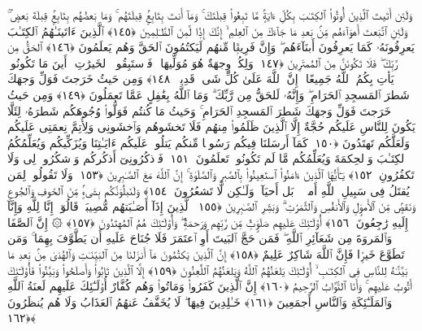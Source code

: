  وَلَئِن أَتَيتَ ٱلَّذِينَ أُوتُوا۟ ٱلكِتَـٰبَ بِكُلِّ ءَايَةٍۢ مَّا تَبِعُوا۟ قِبلَتَكَ ۚ وَمَآ أَنتَ بِتَابِعٍۢ قِبلَتَهُم ۚ وَمَا بَعضُهُم بِتَابِعٍۢ قِبلَةَ بَعضٍۢ ۚ وَلَئِنِ ٱتَّبَعتَ أَهوَآءَهُم مِّنۢ بَعدِ مَا جَآءَكَ مِنَ ٱلعِلمِ ۙ إِنَّكَ إِذًۭا لَّمِنَ ٱلظَّـٰلِمِينَ ﴿١٤٥﴾
 ٱلَّذِينَ ءَاتَينَـٰهُمُ ٱلكِتَـٰبَ يَعرِفُونَهُۥ كَمَا يَعرِفُونَ أَبنَآءَهُم ۖ وَإِنَّ فَرِيقًۭا مِّنهُم لَيَكتُمُونَ ٱلحَقَّ وَهُم يَعلَمُونَ ﴿١٤٦﴾
 ٱلحَقُّ مِن رَّبِّكَ ۖ فَلَا تَكُونَنَّ مِنَ ٱلمُمتَرِينَ ﴿١٤٧﴾
 وَلِكُلٍّۢ وِجهَةٌ هُوَ مُوَلِّيهَا ۖ فَٱستَبِقُوا۟ ٱلخَيرَٰتِ ۚ أَينَ مَا تَكُونُوا۟ يَأتِ بِكُمُ ٱللَّهُ جَمِيعًا ۚ إِنَّ ٱللَّهَ عَلَىٰ كُلِّ شَىءٍۢ قَدِيرٌۭ ﴿١٤٨﴾
 وَمِن حَيثُ خَرَجتَ فَوَلِّ وَجهَكَ شَطرَ ٱلمَسجِدِ ٱلحَرَامِ ۖ وَإِنَّهُۥ لَلحَقُّ مِن رَّبِّكَ ۗ وَمَا ٱللَّهُ بِغَٰفِلٍ عَمَّا تَعمَلُونَ ﴿١٤٩﴾
 وَمِن حَيثُ خَرَجتَ فَوَلِّ وَجهَكَ شَطرَ ٱلمَسجِدِ ٱلحَرَامِ ۚ وَحَيثُ مَا كُنتُم فَوَلُّوا۟ وُجُوهَكُم شَطرَهُۥ لِئَلَّا يَكُونَ لِلنَّاسِ عَلَيكُم حُجَّةٌ إِلَّا ٱلَّذِينَ ظَلَمُوا۟ مِنهُم فَلَا تَخشَوهُم وَٱخشَونِى وَلِأُتِمَّ نِعمَتِى عَلَيكُم وَلَعَلَّكُم تَهتَدُونَ ﴿١٥٠﴾
 كَمَآ أَرسَلنَا فِيكُم رَسُولًۭا مِّنكُم يَتلُوا۟ عَلَيكُم ءَايَـٰتِنَا وَيُزَكِّيكُم وَيُعَلِّمُكُمُ ٱلكِتَـٰبَ وَٱلحِكمَةَ وَيُعَلِّمُكُم مَّا لَم تَكُونُوا۟ تَعلَمُونَ ﴿١٥١﴾
 فَٱذكُرُونِىٓ أَذكُركُم وَٱشكُرُوا۟ لِى وَلَا تَكفُرُونِ ﴿١٥٢﴾
 يَـٰٓأَيُّهَا ٱلَّذِينَ ءَامَنُوا۟ ٱستَعِينُوا۟ بِٱلصَّبرِ وَٱلصَّلَوٰةِ ۚ إِنَّ ٱللَّهَ مَعَ ٱلصَّـٰبِرِينَ ﴿١٥٣﴾
 وَلَا تَقُولُوا۟ لِمَن يُقتَلُ فِى سَبِيلِ ٱللَّهِ أَموَٟتٌۢ ۚ بَل أَحيَآءٌۭ وَلَـٰكِن لَّا تَشعُرُونَ ﴿١٥٤﴾
 وَلَنَبلُوَنَّكُم بِشَىءٍۢ مِّنَ ٱلخَوفِ وَٱلجُوعِ وَنَقصٍۢ مِّنَ ٱلأَموَٟلِ وَٱلأَنفُسِ وَٱلثَّمَرَٰتِ ۗ وَبَشِّرِ ٱلصَّـٰبِرِينَ ﴿١٥٥﴾
 ٱلَّذِينَ إِذَآ أَصَـٰبَتهُم مُّصِيبَةٌۭ قَالُوٓا۟ إِنَّا لِلَّهِ وَإِنَّآ إِلَيهِ رَٰجِعُونَ ﴿١٥٦﴾
 أُو۟لَـٰٓئِكَ عَلَيهِم صَلَوَٟتٌۭ مِّن رَّبِّهِم وَرَحمَةٌۭ ۖ وَأُو۟لَـٰٓئِكَ هُمُ ٱلمُهتَدُونَ ﴿١٥٧﴾
 ۞ إِنَّ ٱلصَّفَا وَٱلمَروَةَ مِن شَعَآئِرِ ٱللَّهِ ۖ فَمَن حَجَّ ٱلبَيتَ أَوِ ٱعتَمَرَ فَلَا جُنَاحَ عَلَيهِ أَن يَطَّوَّفَ بِهِمَا ۚ وَمَن تَطَوَّعَ خَيرًۭا فَإِنَّ ٱللَّهَ شَاكِرٌ عَلِيمٌ ﴿١٥٨﴾
 إِنَّ ٱلَّذِينَ يَكتُمُونَ مَآ أَنزَلنَا مِنَ ٱلبَيِّنَـٰتِ وَٱلهُدَىٰ مِنۢ بَعدِ مَا بَيَّنَّـٰهُ لِلنَّاسِ فِى ٱلكِتَـٰبِ ۙ أُو۟لَـٰٓئِكَ يَلعَنُهُمُ ٱللَّهُ وَيَلعَنُهُمُ ٱللَّٰعِنُونَ ﴿١٥٩﴾
 إِلَّا ٱلَّذِينَ تَابُوا۟ وَأَصلَحُوا۟ وَبَيَّنُوا۟ فَأُو۟لَـٰٓئِكَ أَتُوبُ عَلَيهِم ۚ وَأَنَا ٱلتَّوَّابُ ٱلرَّحِيمُ ﴿١٦٠﴾
 إِنَّ ٱلَّذِينَ كَفَرُوا۟ وَمَاتُوا۟ وَهُم كُفَّارٌ أُو۟لَـٰٓئِكَ عَلَيهِم لَعنَةُ ٱللَّهِ وَٱلمَلَـٰٓئِكَةِ وَٱلنَّاسِ أَجمَعِينَ ﴿١٦١﴾
 خَـٰلِدِينَ فِيهَا ۖ لَا يُخَفَّفُ عَنهُمُ ٱلعَذَابُ وَلَا هُم يُنظَرُونَ ﴿١٦٢﴾
